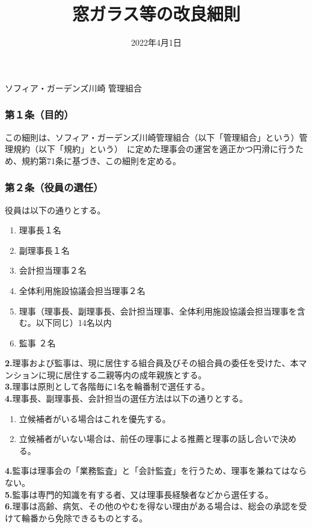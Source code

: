 \documentclass[
  luatex,
  paper=a4paper,
  fontsize=11pt,
  jafontsize=11pt,
  jlreq_notes,
]{jlreq}
\renewcommand{\baselinestretch}{0.9}
\begin{document}
  \title{窓ガラス等の改良細則}
  \date{2022年4月1日}
  \maketitle
  \thispagestyle{empty}
  \vspace*{3\baselineskip}

  {
    \small
    \renewcommand{\baselinestretch}{0.8}\selectfont   %
    \tableofcontents
  }
  \vfill      %
  \begin{center}
    {\Large ソフィア・ガーデンズ川崎 管理組合}
  \end{center}
  \clearpage
  

  \setcounter{page}{1}    %
  \pagestyle{plain}       %

  \subsubsection*{ 第１条（目的）}
  この細則は、ソフィア・ガーデンズ川崎管理組合（以下「管理組合」という）管理規約（以下「規約」という）\
  に定めた理事会の運営を適正かつ円滑に行うため、規約第71条に基づき、この細則を定める。
  \subsubsection*{ 第２条（役員の選任）}
  役員は以下の通りとする。
  \begin{enumerate}
  \item 理事長１名
  \item 副理事長１名
  \item 会計担当理事２名
  \item 全体利用施設協議会担当理事２名
  \item 理事（理事長、副理事長、会計担当理事、全体利用施設協議会担当理事を含む。以下同じ）14名以内
  \item 監事    ２名
  \end{enumerate}
  \textbf{2.}理事および監事は、現に居住する組合員及びその組合員の委任を受けた、本マンションに現に居住する二親等内の成年親族とする。\\
  \textbf{3.}理事は原則として各階毎に1名を輪番制で選任する。\\
  \textbf{4.}理事長、副理事長、会計担当の選任方法は以下の通りとする。
  \begin{enumerate}
  \item 立候補者がいる場合はこれを優先する。
  \item 立候補者がいない場合は、前任の理事による推薦と理事の話し合いで決める。
  \end{enumerate}
  \textbf{4.}監事は理事会の「業務監査」と「会計監査」を行うため、理事を兼ねてはならない。\\
  \textbf{5.}監事は専門的知識を有する者、又は理事長経験者などから選任する。\\
  \textbf{6.}理事は高齢、病気、その他のやむを得ない理由がある場合は、総会の承認を受けて輪番から免除できるものとする。
\end{document}
